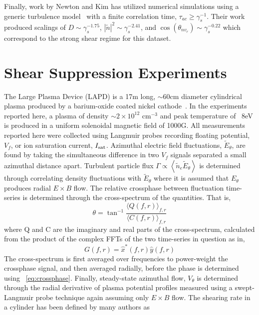\documentclass[aip,pop,amsmath,amssymb,preprint,superscriptaddress]{revtex4-1} %
\begin{document}
Finally, work by Newton and Kim has utilized numerical simulations
using a generic turbulence model~\cite{newton11} with a finite
correlation time, $\tau_{ac} \geq \gamma_{s}^{-1}$. Their work produced scalings of $D \sim \gamma_{s}^{-1.75}$, $|\tilde{n}|^{2} \sim \gamma_{s}^{-2.41}$, and $\cos(\theta_{nv_{r}}) \sim \gamma_{s}^{-0.22}$ which correspond to the strong shear regime for this dataset.

\section{Shear Suppression Experiments}

The Large Plasma Device (LAPD) is a 17m long, $\sim$60cm diameter cylindrical plasma produced by a barium-oxide coated nickel cathode~\cite{gek91}. In the experiments reported here, a plasma of density $\sim$$2 \times 10^{12}$ cm$^{-3}$ and peak temperature of ~8eV is produced in a uniform solenoidal magnetic field of 1000G. All measurements reported here were collected using Langmuir probes recording floating potential, $V_{f}$, or ion saturation current, $I_{\rm sat}$. Azimuthal electric field fluctuations, $\tilde{E}_{\theta}$, are found by taking the simultaneous difference in two $V_{f}$ signals separated a small azimuthal distance apart. Turbulent particle flux $\Gamma \propto \left<\tilde{n}_e \tilde{E}_\theta\right>$ is determined through correlating density fluctuations with $\tilde{E}_{\theta}$ where it is assumed that $E_{\theta}$ produces radial $E \times B$ flow. The relative crossphase between fluctuation time-series is determined through the cross-spectrum of the quantities. That is,
%
\begin{equation}
\theta = \tan^{-1}\frac{\langle Q(f,r)\rangle_{f,r}}{\langle C(f,r)\rangle_{f,r}}
\label{eq:crossphase}
\end{equation}
%
where Q and C are the imaginary and real parts of the cross-spectrum, calculated from the product of the complex FFTs of the two time-series in question as in,
\begin{equation}
G(f,r) = \hat{x}^{\ast}(f,r)\hat{y}(f,r)
\label{eq:crossspectrum}
\end{equation}
%
The cross-spectrum is first averaged over frequencies to power-weight
the crossphase signal, and then averaged radially, before the phase is
determined using ~\ref{eq:crossphase}. Finally, steady-state azimuthal
flow, $V_{\theta}$ is determined through the radial derivative of
plasma potential profiles measured using a swept-Langmuir probe
technique again assuming only $E \times B$ flow. The shearing rate in
a cylinder has been defined by many authors as 
\end{document}

